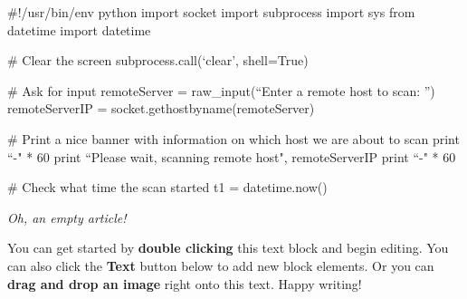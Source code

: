 #!/usr/bin/env python
import socket
import subprocess
import sys
from datetime import datetime

# Clear the screen
subprocess.call(`clear', shell=True)

# Ask for input
remoteServer    = raw_input(``Enter a remote host to scan: '')
remoteServerIP  = socket.gethostbyname(remoteServer)

# Print a nice banner with information on which host we are about to scan
print ``-" * 60
print ``Please wait, scanning remote host", remoteServerIP
print ``-" * 60

# Check what time the scan started
t1 = datetime.now()

\textit{Oh, an empty article!} 

You can get started by \textbf{double clicking} this text block and begin editing. You can also click the \textbf{Text} button below to add new block elements. Or you can \textbf{drag and drop an image} right onto this text. Happy writing!
